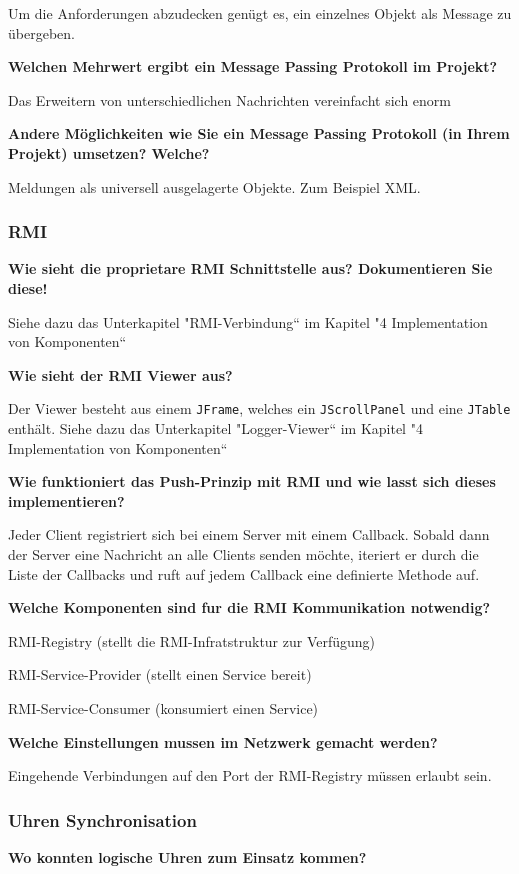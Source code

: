 \documentclass[12pt,a4paper,twosided]{scrartcl}
\newenvironment{tight_enumerate}{
\begin{enumerate}
	\setlength{\itemsep}{0pt}
	\setlength{\parskip}{0pt}
}{\end{enumerate}}
\begin{document}
Um die Anforderungen abzudecken genügt es, ein einzelnes Objekt als Message zu übergeben.

\textbf{Welchen Mehrwert ergibt ein Message Passing Protokoll im Projekt?}

Das Erweitern von unterschiedlichen Nachrichten vereinfacht sich enorm

\textbf{Andere Möglichkeiten wie Sie ein Message Passing Protokoll (in Ihrem Projekt) umsetzen? Welche?}

Meldungen als universell ausgelagerte Objekte. Zum Beispiel XML.

\subsubsection{RMI}
\textbf{Wie sieht die proprietare RMI Schnittstelle aus? Dokumentieren Sie diese!}

Siehe dazu das Unterkapitel "RMI-Verbindung`` im Kapitel "4 Implementation von Komponenten``

\textbf{Wie sieht der RMI Viewer aus?}

Der Viewer besteht aus einem \texttt{JFrame}, welches ein \texttt{JScrollPanel} und eine \texttt{JTable} enthält.
Siehe dazu das Unterkapitel "Logger-Viewer`` im Kapitel "4 Implementation von Komponenten``

\textbf{Wie funktioniert das Push-Prinzip mit RMI und wie lasst sich dieses implementieren?}

Jeder Client registriert sich bei einem Server mit einem Callback. Sobald dann
der Server eine Nachricht an alle Clients senden möchte, iteriert er durch die
Liste der Callbacks und ruft auf jedem Callback eine definierte Methode auf.

\textbf{Welche Komponenten sind fur die RMI Kommunikation notwendig?}

\begin{tight_enumerate}
	\item RMI-Registry (stellt die RMI-Infratstruktur zur Verfügung)
	\item RMI-Service-Provider (stellt einen Service bereit)
	\item RMI-Service-Consumer (konsumiert einen Service)
\end{tight_enumerate}

\textbf{Welche Einstellungen mussen im Netzwerk gemacht werden?}

Eingehende Verbindungen auf den Port der RMI-Registry müssen erlaubt sein.

\subsubsection{Uhren Synchronisation}
\textbf{Wo konnten logische Uhren zum Einsatz kommen?}
\end{document}
